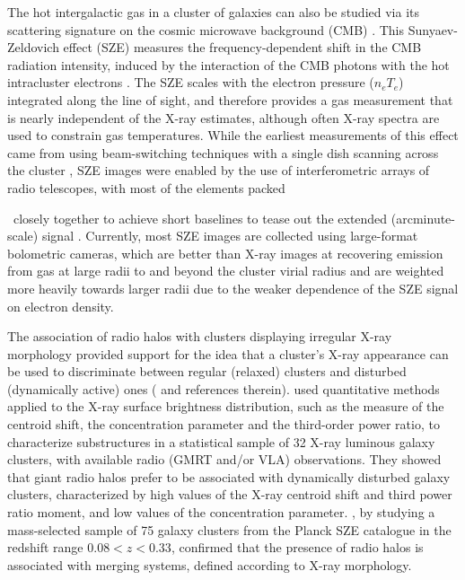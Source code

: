 \documentclass[iop,twocolumn]{emulateapj}
\begin{document}
The hot intergalactic gas in a cluster of galaxies can also be studied via its scattering signature on
the cosmic microwave background (CMB) \citep{1972CoASP...4..173S}. 
This Sunyaev-Zeldovich effect (SZE) measures the frequency-dependent shift in the 
CMB radiation intensity, induced by the interaction of the CMB photons with the hot intracluster electrons \citep{1965PhFl....8.2112W}.
The SZE scales with the electron pressure ($n_e T_e$) integrated along the line of sight, and therefore provides a 
gas measurement that is nearly independent of the X-ray estimates, although often X-ray spectra are used to 
constrain gas temperatures. 
While the earliest measurements of this effect came from using beam-switching techniques
with a single dish scanning across the cluster \citep[e.g.,][]{1978MNRAS.185..245B}, SZE images were enabled by the use of interferometric arrays of radio telescopes, with most of the elements packed {\ closely together  to achieve short baselines to 
tease out the extended (arcminute-scale) signal \citep[See review in ][]{2002ARA&A..40..643C}. 
Currently, most SZE images are collected using large-format bolometric cameras, which are better than X-ray images at recovering 
emission from gas at large radii to and beyond the cluster virial radius \citep[e.g., ][]{2010ApJ...716.1118P, Sayers2013}
 and are weighted more heavily towards larger radii due to the weaker 
dependence of the SZE signal on electron density.

The association of radio halos with clusters displaying irregular X-ray morphology provided support for the idea that a cluster's X-ray appearance can be used to discriminate between regular (relaxed) clusters and disturbed (dynamically active) ones (\citealt{2013AstRv...8a..40R} and references therein).
\citet{2010ApJ...721L..82C} used quantitative methods applied to the X-ray surface brightness distribution, such as the measure of the centroid shift, the concentration parameter and the third-order power ratio, to characterize substructures in a statistical sample of 32 X-ray luminous galaxy clusters, with available radio (GMRT and/or VLA) observations. 
They showed that giant radio halos prefer to be associated with dynamically disturbed galaxy clusters, characterized by high values of the X-ray centroid shift and third power ratio moment, and low values of the concentration parameter. 
\citet{2015arXiv150603209C}, by studying a mass-selected sample of 75 galaxy clusters from the Planck SZE catalogue in the redshift range $0.08 < z < 0.33$, confirmed that the presence of radio halos is associated with merging systems, defined according to X-ray morphology. 

}
\end{document}
